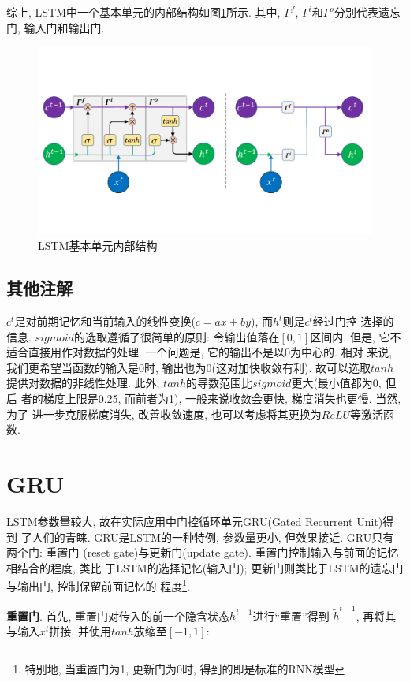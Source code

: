 \documentclass[UTF8, twocolumn]{ctexart}
\begin{document}
综上, LSTM中一个基本单元的内部结构如图\ref{lstm2}所示. 其中, $\Gamma^f$, 
$\Gamma^i$和$\Gamma^o$分别代表遗忘门, 输入门和输出门.


\begin{figure}[!hbt]
    \center
    \includegraphics[width=.8\linewidth]{lstm2.pdf}
    \caption{LSTM基本单元内部结构}
    \label{lstm2}
\end{figure}

\subsection{其他注解}
$c^t$是对前期记忆和当前输入的线性变换($c=ax+by$), 而$h^t$则是$c^t$经过门控
选择的信息. $sigmoid$的选取遵循了很简单的原则: 令输出值落在$[0,1]$区间内.
但是, 它不适合直接用作对数据的处理. 一个问题是, 它的输出不是以0为中心的. 相对
来说, 我们更希望当函数的输入是0时, 输出也为0(这对加快收敛有利). 故可以选取$tanh$
提供对数据的非线性处理. 此外, $tanh$的导数范围比$sigmoid$更大(最小值都为0, 但后
者的梯度上限是0.25, 而前者为1), 一般来说收敛会更快, 梯度消失也更慢. 当然, 为了
进一步克服梯度消失, 改善收敛速度, 也可以考虑将其更换为$ReLU$等激活函数.


\section{GRU}
LSTM参数量较大, 故在实际应用中门控循环单元GRU(Gated Recurrent Unit)\cite{5}得到
了人们的青睐. GRU是LSTM的一种特例, 参数量更小, 但效果接近. GRU只有两个门: 重置门
(reset gate)与更新门(update gate). 重置门控制输入与前面的记忆相结合的程度, 类比
于LSTM的选择记忆(输入门); 更新门则类比于LSTM的遗忘门与输出门, 控制保留前面记忆的
程度\footnote{特别地, 当重置门为1, 更新门为0时, 得到的即是标准的RNN模型\cite{6}}.



{\bf 重置门}. 首先, 重置门对传入的前一个隐含状态$h^{t-1}$进行``重置''得到
$\widetilde{h}^{t-1}$, 再将其与输入$x^t$拼接, 并使用$tanh$放缩至$[-1,1]$:
\end{document}
